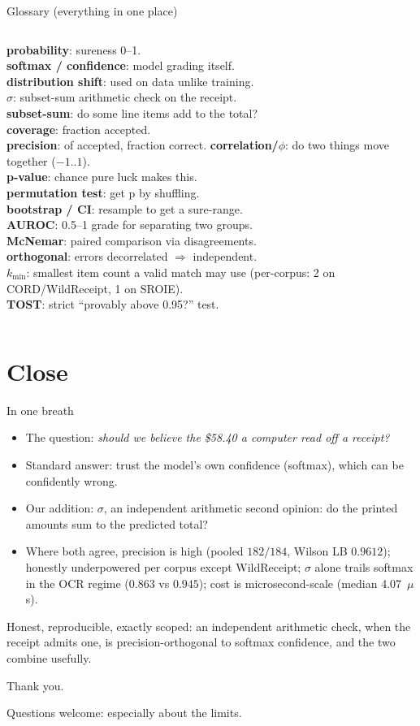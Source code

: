 \documentclass[aspectratio=169]{beamer}
\newcommand{\rgPoolWil}{0.9612}
\newcommand{\latMedian}{4.07}
\newcommand{\latUnit}{\ensuremath{\mu}s}
\newcommand{\bigq}[1]{\begin{center}{\Large #1}\end{center}}
\newcommand{\keybox}[1]{\begin{center}\colorbox{grey!15}{\parbox{0.92\linewidth}{\centering #1}}\end{center}}
\begin{document}
\begin{frame}{Glossary (everything in one place)}
\scriptsize
\begin{columns}
\textbf{probability}: sureness 0--1.\\
\textbf{softmax / confidence}: model grading itself.\\
\textbf{distribution shift}: used on data unlike training.\\
\textbf{$\sigma$}: subset-sum arithmetic check on the receipt.\\
\textbf{subset-sum}: do some line items add to the total?\\
\textbf{coverage}: fraction accepted.\\
\textbf{precision}: of accepted, fraction correct.
\textbf{correlation/$\phi$}: do two things move together ($-1..1$).\\
\textbf{p-value}: chance pure luck makes this.\\
\textbf{permutation test}: get p by shuffling.\\
\textbf{bootstrap / CI}: resample to get a sure-range.\\
\textbf{AUROC}: 0.5--1 grade for separating two groups.\\
\textbf{McNemar}: paired comparison via disagreements.\\
\textbf{orthogonal}: errors decorrelated $\Rightarrow$ independent.\\
\textbf{$k_{\min}$}: smallest item count a valid match may use
(per-corpus: 2 on CORD/WildReceipt, 1 on SROIE).\\
\textbf{TOST}: strict ``provably above 0.95?'' test.
\end{columns}
\end{frame}

\section{Close}
\begin{frame}{In one breath}
\begin{itemize}
\item The question: \emph{should we believe the \$58.40 a computer
read off a receipt?}
\item Standard answer: trust the model's own confidence (softmax),
which can be confidently wrong.
\item Our addition: $\sigma$, an independent arithmetic second
opinion: do the printed amounts sum to the predicted total?
\item Where both agree, precision is high (pooled $182/184$, Wilson
LB $\rgPoolWil$); honestly underpowered per corpus except WildReceipt;
$\sigma$ alone trails softmax in the OCR regime ($0.863$ vs $0.945$);
cost is microsecond-scale (median \latMedian~\latUnit{}).
\end{itemize}
\keybox{Honest, reproducible, exactly scoped: an independent
arithmetic check, when the receipt admits one, is precision-orthogonal
to softmax confidence, and the two combine usefully.}
\end{frame}

\begin{frame}
\vfill
\bigq{Thank you.}
\vspace{0.6em}
\bigq{\normalsize Questions welcome: especially about the limits.}
\vfill
\end{frame}
\end{document}
